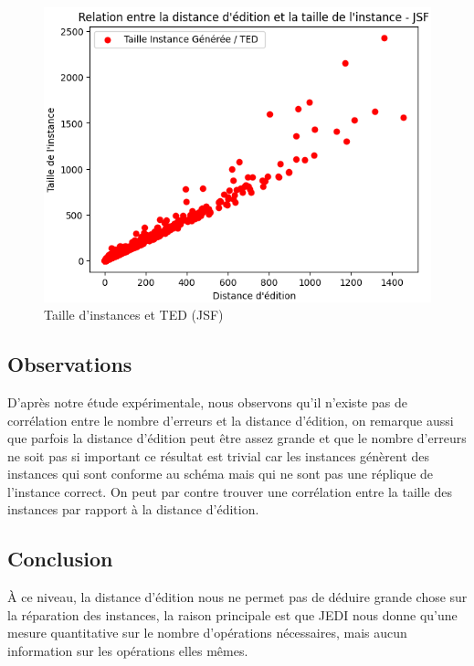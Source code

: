         \begin{figure}[H]\ContinuedFloat
          \centering
          \includegraphics[scale=0.5]{Photos/ted_vs_errors/taille_vs_ted_jSF.PNG}
          \caption{Taille d'instances et TED (JSF)}
        \end{figure}
      
      \subsection{Observations} 
        D'après notre étude expérimentale, nous observons qu'il n'existe pas de corrélation entre le nombre d'erreurs et la distance d'édition, 
        on remarque aussi que parfois la distance d'édition peut être assez grande et que le nombre d'erreurs ne soit pas si important ce résultat 
        est trivial car les instances génèrent des instances qui sont conforme au schéma mais qui ne sont pas une réplique de l'instance correct. On peut par contre 
        trouver une corrélation entre la taille des instances par rapport à la distance d'édition.
      \subsection{Conclusion}
        À ce niveau, la distance d'édition nous ne permet pas de déduire grande chose sur la réparation des instances, la raison principale est que JEDI nous donne qu'une mesure 
        quantitative sur le nombre d'opérations nécessaires, mais aucun information sur les opérations elles mêmes. 


